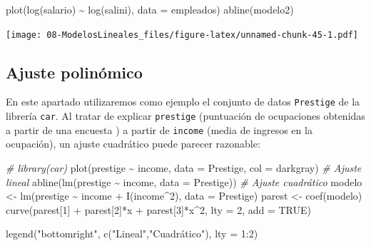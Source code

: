 \documentclass[
]{book}
\newenvironment{Shaded}{\begin{snugshade}}{\end{snugshade}}
\newcommand{\AttributeTok}[1]{\textcolor[rgb]{0.77,0.63,0.00}{#1}}
\newcommand{\CommentTok}[1]{\textcolor[rgb]{0.56,0.35,0.01}{\textit{#1}}}
\newcommand{\ConstantTok}[1]{\textcolor[rgb]{0.00,0.00,0.00}{#1}}
\newcommand{\DecValTok}[1]{\textcolor[rgb]{0.00,0.00,0.81}{#1}}
\newcommand{\FunctionTok}[1]{\textcolor[rgb]{0.00,0.00,0.00}{#1}}
\newcommand{\NormalTok}[1]{#1}
\newcommand{\OtherTok}[1]{\textcolor[rgb]{0.56,0.35,0.01}{#1}}
\newcommand{\SpecialCharTok}[1]{\textcolor[rgb]{0.00,0.00,0.00}{#1}}
\newcommand{\StringTok}[1]{\textcolor[rgb]{0.31,0.60,0.02}{#1}}
\theoremstyle{break}
\begin{document}
\begin{Shaded}
\begin{Highlighting}[]
\FunctionTok{plot}\NormalTok{(}\FunctionTok{log}\NormalTok{(salario) }\SpecialCharTok{\textasciitilde{}} \FunctionTok{log}\NormalTok{(salini), }\AttributeTok{data =}\NormalTok{ empleados)}
\FunctionTok{abline}\NormalTok{(modelo2)}
\end{Highlighting}
\end{Shaded}

\texttt{[image: 08-ModelosLineales\_files/figure-latex/unnamed-chunk-45-1.pdf]}

\hypertarget{ajuste-polinuxf3mico}{%
\subsection{Ajuste polinómico}\label{ajuste-polinuxf3mico}}

En este apartado utilizaremos como ejemplo el conjunto de datos \texttt{Prestige} de la librería \texttt{car}. Al tratar de explicar \texttt{prestige} (puntuación de ocupaciones obtenidas a partir de una encuesta ) a partir de \texttt{income} (media de ingresos en la ocupación), un ajuste cuadrático puede parecer razonable:

\begin{Shaded}
\begin{Highlighting}[]
\CommentTok{\# library(car)}
\FunctionTok{plot}\NormalTok{(prestige }\SpecialCharTok{\textasciitilde{}}\NormalTok{ income, }\AttributeTok{data =}\NormalTok{ Prestige, }\AttributeTok{col =} \StringTok{\textquotesingle{}darkgray\textquotesingle{}}\NormalTok{)}
\CommentTok{\# Ajuste lineal}
\FunctionTok{abline}\NormalTok{(}\FunctionTok{lm}\NormalTok{(prestige }\SpecialCharTok{\textasciitilde{}}\NormalTok{ income, }\AttributeTok{data =}\NormalTok{ Prestige)) }
\CommentTok{\# Ajuste cuadrático}
\NormalTok{modelo }\OtherTok{\textless{}{-}} \FunctionTok{lm}\NormalTok{(prestige }\SpecialCharTok{\textasciitilde{}}\NormalTok{ income }\SpecialCharTok{+} \FunctionTok{I}\NormalTok{(income}\SpecialCharTok{\^{}}\DecValTok{2}\NormalTok{), }\AttributeTok{data =}\NormalTok{ Prestige)}
\NormalTok{parest }\OtherTok{\textless{}{-}} \FunctionTok{coef}\NormalTok{(modelo)}
\FunctionTok{curve}\NormalTok{(parest[}\DecValTok{1}\NormalTok{] }\SpecialCharTok{+}\NormalTok{ parest[}\DecValTok{2}\NormalTok{]}\SpecialCharTok{*}\NormalTok{x }\SpecialCharTok{+}\NormalTok{ parest[}\DecValTok{3}\NormalTok{]}\SpecialCharTok{*}\NormalTok{x}\SpecialCharTok{\^{}}\DecValTok{2}\NormalTok{, }\AttributeTok{lty =} \DecValTok{2}\NormalTok{, }\AttributeTok{add =} \ConstantTok{TRUE}\NormalTok{)}

\FunctionTok{legend}\NormalTok{(}\StringTok{"bottomright"}\NormalTok{, }\FunctionTok{c}\NormalTok{(}\StringTok{"Lineal"}\NormalTok{,}\StringTok{"Cuadrático"}\NormalTok{), }\AttributeTok{lty =} \DecValTok{1}\SpecialCharTok{:}\DecValTok{2}\NormalTok{)}
\end{Highlighting}
\end{Shaded}
\end{document}
